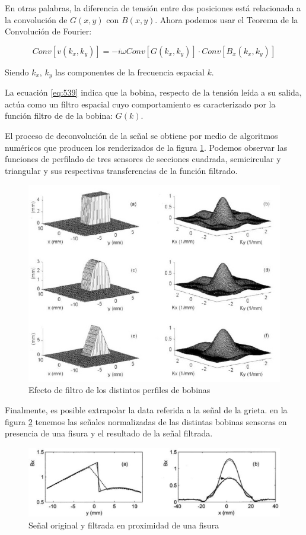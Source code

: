En otras palabras, la diferencia de tensión entre dos posiciones está relacionada a la convolución de $G(x,y)$ con $B(x,y)$. Ahora podemos usar el Teorema de la Convolución de Fourier:

\begin{equation}
	\label{eq:539}
	Conv\left[ v(k_{x},k_{y})\right] = -i \omega Conv\left[ G(k_{x},k_{y})\right]\cdot Conv\left[ B_{x}(k_{x},k_{y})\right]
\end{equation}

Siendo $k_{x}$, $k_{y}$ las componentes de la frecuencia espacial $k$.

La ecuación \ref{eq:539} indica que la bobina, respecto de la tensión leída a su salida, actúa como un filtro espacial cuyo comportamiento es caracterizado por la función filtro de de la bobina: $G(k)$.

El proceso de deconvolución de la señal se obtiene por medio de algoritmos numéricos que producen los renderizados de la figura \ref{fig:511}. Podemos observar las funciones de perfilado de tres sensores de secciones cuadrada, semicircular y triangular y sus respectivas transferencias de la función filtrado.


\begin{figure}[H]
    \centering
    \includegraphics[width=1.0\textwidth]{./Figures/fig511}
	\caption{Efecto de filtro de los distintos perfiles de bobinas}
	\label{fig:511}
\end{figure}

Finalmente, es posible extrapolar la data referida a la señal de la grieta. en la figura \ref{fig:512} tenemos las señales normalizadas de las distintas bobinas sensoras en presencia de una fisura y el resultado de la señal filtrada.

\begin{figure}[H]
    \centering
    \includegraphics[width=1.0\textwidth]{./Figures/fig512}
	\caption{Señal original y filtrada en proximidad de una fisura}
	\label{fig:512}
\end{figure}








